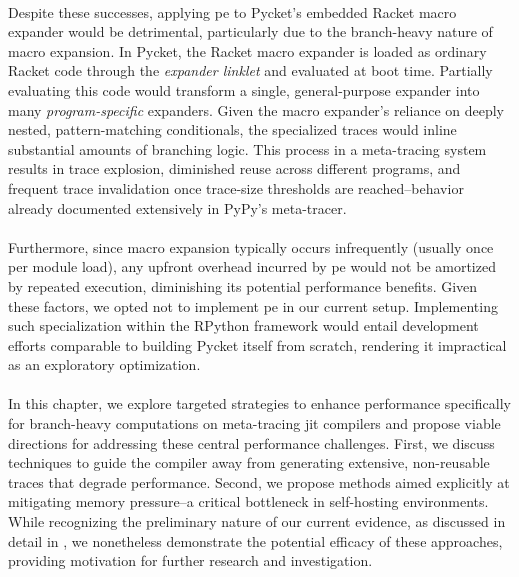   \paragraph{}%
    Despite these successes, applying \gls{pe} to Pycket's embedded Racket macro expander would be detrimental, particularly due to the branch-heavy nature of macro expansion. In Pycket, the Racket macro expander is loaded as ordinary Racket code through the \textit{expander linklet} and evaluated at boot time. Partially evaluating this code would transform a single, general-purpose expander into many \emph{program-specific} expanders. Given the macro expander's reliance on deeply nested, pattern-matching conditionals, the specialized traces would inline substantial amounts of branching logic. This process in a meta-tracing system results in trace explosion, diminished reuse across different programs, and frequent trace invalidation once trace-size thresholds are reached--behavior already documented extensively in PyPy’s meta-tracer.

  \paragraph{}%
    Furthermore, since macro expansion typically occurs infrequently (usually once per module load), any upfront overhead incurred by \gls{pe} would not be amortized by repeated execution, diminishing its potential performance benefits. Given these factors, we opted not to implement \gls{pe} in our current setup. Implementing such specialization within the RPython framework would entail development efforts comparable to building Pycket itself from scratch, rendering it impractical as an exploratory optimization.

  \paragraph{}%
    In this chapter, we explore targeted strategies to enhance performance specifically for branch-heavy computations on meta-tracing \gls{jit} compilers and propose viable directions for addressing these central performance challenges. First, we discuss techniques to guide the compiler away from generating extensive, non-reusable traces that degrade performance. Second, we propose methods aimed explicitly at mitigating memory pressure--a critical bottleneck in self-hosting environments. While recognizing the preliminary nature of our current evidence, as discussed in detail in , we nonetheless demonstrate the potential efficacy of these approaches, providing motivation for further research and investigation.

